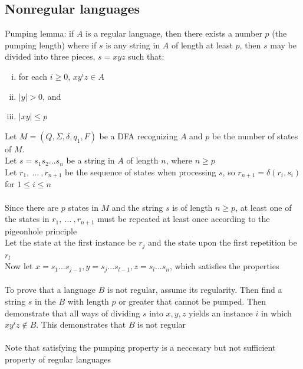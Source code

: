 \documentclass{article}
\newcommand*{\<}{\langle}
\renewcommand*{\>}{\rangle}
\begin{document}
		\subsection{Nonregular languages}
			Pumping lemma: if $A$ is a regular language, then there exists a number $p$ (the pumping length) where if $s$ is any string in $A$ of length at least $p$, then $s$ may be divided into three pieces, $s = xyz$ such that:
			\begin{enumerate}[(i)]
				\item for each $i \geq 0$, $xy^iz \in A$
				\item $|y| > 0$, and
				\item $|xy| \leq p$
				\end{enumerate}
			Let $M = (Q, \Sigma, \delta, q_1, F)$ be a DFA recognizing $A$ and $p$ be the number of states of $M$. \\
			Let $s = s_1s_2...s_n$ be a string in $A$ of length $n$, where $n \geq p$ \\
			Let $r_1,\:...\:, r_{n + 1}$ be the sequence of states when processing $s$, so $r_{n + 1} = \delta(r_i, s_i)$ for $1 \leq i \leq n$ \\
			\\
			Since there are $p$ states in $M$ and the string $s$ is of length $n \geq p$, at least one of the states in $r_1,\:...\:, r_{n + 1}$ must be repeated at least once according to the pigeonhole principle \\
			Let the state at the first instance be $r_j$ and the state upon the first repetition be $r_l$ \\
			Now let $x = s_1...s_{j - 1}, y = s_j...s_{l - 1}, z = s_l...s_n$, which satisfies the properties \\
			\\
			To prove that a language $B$ is not regular, assume its regularity. Then find a string $s$ in the $B$ with length $p$ or greater that cannot be pumped. Then demonstrate that all ways of dividing $s$ into $x, y, z$ yields an instance $i$ in which $xy^iz \notin B$. This demonstrates that $B$ is not regular \\
			\\
			Note that satisfying the pumping property is a neccesary but not sufficient property of regular languages
\end{document}
